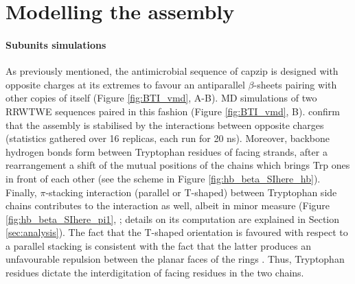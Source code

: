 \section{Modelling the assembly} \label{sec:build}

\paragraph{Subunits simulations} As previously mentioned, the antimicrobial sequence of capzip is designed with opposite charges at its extremes to favour an antiparallel $\beta$-sheets pairing with other copies of itself (Figure \ref{fig:BTI_vmd}, A-B).
%
MD simulations of two RRWTWE sequences paired in this fashion (Figure \ref{fig:BTI_vmd}, B). confirm that the assembly is stabilised by the interactions between opposite charges (statistics gathered over 16 replicas, each run for 20 ns).
%
Moreover, backbone hydrogen bonds form between Tryptophan residues of facing strands, after a rearrangement a shift of the mutual positions of the chains which brings Trp ones in front of each other (see the scheme in Figure \ref{fig:hb_beta_SIhere_hb}).
%
Finally, $\pi$-stacking interaction (parallel or T-shaped) between Tryptophan side chains contributes to the interaction as well, albeit in minor measure (Figure \ref{fig:hb_beta_SIhere_pi1}, ; details on its computation are explained in Section \ref{sec:analysis}). The fact that the T-shaped orientation is favoured with respect to a parallel stacking is consistent with the fact that the latter produces an unfavourable repulsion between the planar faces of the rings \cite{Hunter2001}.  
%
Thus, Tryptophan residues dictate the interdigitation of facing residues in the two chains.
%
